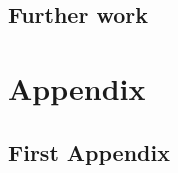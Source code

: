 \documentclass[a4paper,12pt,twoside,notitlepage]{report}
\begin{document}
\section{Further work}



\appendix
\chapter*{Appendix}

\section{First Appendix}
\end{document}

